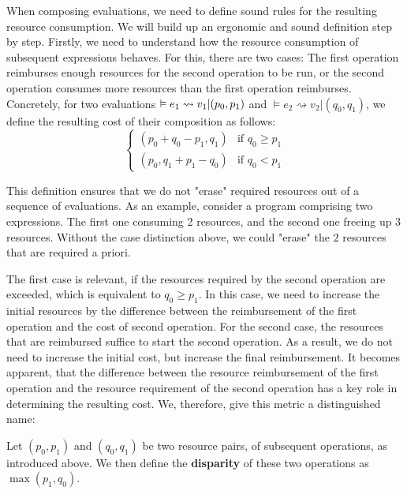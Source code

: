 When composing evaluations, we need to define sound rules for the resulting resource consumption. We will build up an ergonomic and sound definition step by step. Firstly, we need to understand how the resource consumption of subsequent expressions behaves. For this, there are two cases: The first operation reimburses enough resources for the second operation to be run, or the second operation consumes more resources than the first operation reimburses. Concretely, for two evaluations \( \vDash e_1 \rightsquigarrow v_1 | (p_0, p_1)\) and \( \vDash e_2 \rightsquigarrow v_2 | (q_0, q_1)\), we define the resulting cost of their composition as follows:
\begin{equation}
   \label{def:multiplying-resources}
   \begin{cases}
      (p_0 + q_0 - p_1, q_1) & \mbox{if } q_0 \geq p_1 \\
      (p_0, q_1 + p_1 - q_0) & \mbox{if } q_0 <    p_1 
   \end{cases}
\end{equation}

This definition ensures that we do not "erase" required resources out of a sequence of evaluations. As an example, consider a program comprising two expressions. The first one consuming 2 resources, and the second one freeing up 3 resources. Without the case distinction above, we could "erase" the \(2\) resources that are required a priori. 

The first case is relevant, if the resources required by the second operation are exceeded, which is equivalent to \(q_0 \geq p_1\). In this case, we need to increase the initial resources by the difference between the reimbursement of the first operation and the cost of second operation. For the second case, the resources that are reimbursed suffice to start the second operation. As a result, we do not need to increase the initial cost, but increase the final reimbursement. It becomes apparent, that the difference between the resource reimbursement of the first operation and the resource requirement of the second operation has a key role in determining the resulting cost. We, therefore, give this metric a distinguished name:

\begin{definition}
   Let \((p_0, p_1)\) and \((q_0, q_1)\) be two resource pairs, of subsequent operations, as introduced above. We then define the \textbf{disparity} of these two operations as \(\max(p_1, q_0)\).
\end{definition}


